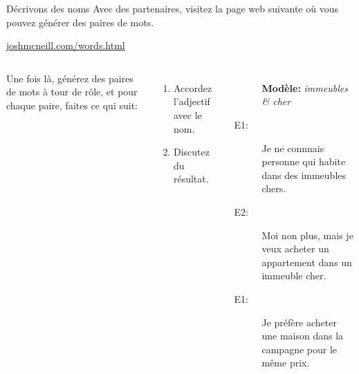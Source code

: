 \begin{frame}{Décrivons des noms}
  Avec des partenaires, visitez la page web suivante où vous pouvez générer des paires de mots.
  \begin{center}
    \href{https://joshmcneill.com/words.html}{joshmcneill.com/words.html}
  \end{center}
  \begin{columns}
      Une fois là, générez des paires de mots à tour de rôle, et pour chaque paire, faites ce qui suit:
      \begin{enumerate}
        \item Accordez l'adjectif avec le nom.
        \item Discutez du résultat.
      \end{enumerate}
      \begin{description}
        \item[] \textbf{Modèle:} \emph{immeubles \& cher}
        \item[E1:] Je ne connnais personne qui habite dans des \alert{immeubles chers}.
        \item[E2:] Moi non plus, mais je veux acheter un appartement dans un immeuble cher.
        \item[E1:] Je préfère acheter une maison dans la campagne pour le même prix.
      \end{description}
  \end{columns}
\end{frame}
